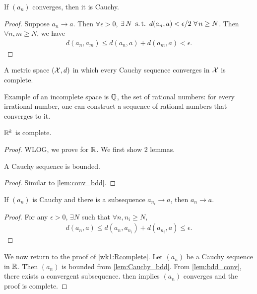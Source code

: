 \documentclass[12pt]{article}
\begin{document}
\begin{Lemma}
If $(a_n)$ converges, then it is Cauchy.
\end{Lemma}
\begin{proof}
Suppose $a_n\to a$. Then $\forall \epsilon >0$, $\exists N\ \st d(a_n,a) < \epsilon/2\ \forall n\geq N$. Then $\forall n,m \geq N$, we have
\begin{align*}
d(a_n, a_m) \leq d(a_n,a) + d(a_m,a) < \epsilon.
\end{align*}
\end{proof}

\begin{Definition}
A metric space $(\mathcal{X}, d)$ in which every Cauchy sequence converges in $\mathcal{X}$ is complete.
\end{Definition}

Example of an incomplete space is $\mathbb{Q}$, the set of rational numbers: for every irrational number, one can construct a sequence of rational numbers that converges to it.


\begin{Theorem}\label{wk1:Rcomplete}
$\mathbb{R}^k$ is complete.
\end{Theorem}
\begin{proof}
WLOG, we prove for $\mathbb{R}$. We first show 2 lemmas.

\begin{Lemma}\label{lem:Cauchy_bdd}
A Cauchy sequence is bounded.
\end{Lemma}
\begin{proof}
Similar to \cref{lem:conv_bdd}.
\end{proof}

\begin{Lemma}\label{lem:Cauchy_sub}
If $(a_n)$ is Cauchy and there is a subsequence $a_{n_i} \to a$, then $a_n \to a$.
\end{Lemma}
\begin{proof}
For any $\epsilon > 0$, $\exists N$ such that $\forall n, n_i \geq N$,
\begin{align*}
d(a_n, a) \leq d(a_n, a_{n_i}) + d(a_{n_i},a) \leq \epsilon.
\end{align*}
\end{proof}

We now return to the proof of \cref{wk1:Rcomplete}. Let $(a_n)$ be a Cauchy sequence in $\mathbb{R}$. Then $(a_n)$ is bounded from \cref{lem:Cauchy_bdd}. From \cref{lem:bdd_conv}, there exists a convergent subsequence.  then implies $(a_n)$ converges and the proof is complete.
\end{proof}

%

\end{document}

